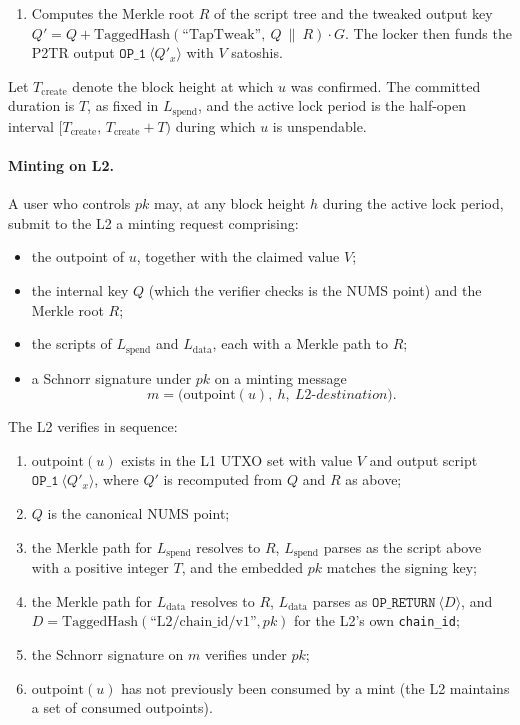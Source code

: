 \documentclass[11pt,a4paper]{article}
\begin{document}
\begin{enumerate}[leftmargin=*]
  \item Computes the Merkle root $R$ of the script tree and the tweaked output key $Q' = Q + \mathrm{TaggedHash}(\text{``TapTweak''},\ Q\ \|\ R) \cdot G$. The locker then funds the P2TR output $\texttt{OP\_1}\ \langle Q'_x\rangle$ with $V$ satoshis.
\end{enumerate}

Let $T_{\mathrm{create}}$ denote the block height at which $u$ was confirmed. The committed duration is $T$, as fixed in $L_{\mathrm{spend}}$, and the active lock period is the half-open interval $[T_{\mathrm{create}},\, T_{\mathrm{create}} + T)$ during which $u$ is unspendable.

\paragraph{Minting on L2.} A user who controls $pk$ may, at any block height $h$ during the active lock period, submit to the L2 a minting request comprising:

\begin{itemize}[leftmargin=*]
  \item the outpoint of $u$, together with the claimed value $V$;
  \item the internal key $Q$ (which the verifier checks is the NUMS point) and the Merkle root $R$;
  \item the scripts of $L_{\mathrm{spend}}$ and $L_{\mathrm{data}}$, each with a Merkle path to $R$;
  \item a Schnorr signature under $pk$ on a minting message
  \[
  m = \big(\mathrm{outpoint}(u),\ h,\ \mathit{L2\text{-}destination}\big).
  \]
\end{itemize}

The L2 verifies in sequence:
\begin{enumerate}[leftmargin=*,label=(\roman*)]
  \item $\mathrm{outpoint}(u)$ exists in the L1 UTXO set with value $V$ and output script $\texttt{OP\_1}\ \langle Q'_x\rangle$, where $Q'$ is recomputed from $Q$ and $R$ as above;
  \item $Q$ is the canonical NUMS point;
  \item the Merkle path for $L_{\mathrm{spend}}$ resolves to $R$, $L_{\mathrm{spend}}$ parses as the script above with a positive integer $T$, and the embedded $pk$ matches the signing key;
  \item the Merkle path for $L_{\mathrm{data}}$ resolves to $R$, $L_{\mathrm{data}}$ parses as $\texttt{OP\_RETURN}\ \langle D\rangle$, and $D = \mathrm{TaggedHash}(\text{``L2/chain\_id/v1''}, pk)$ for the L2's own \texttt{chain\_id};
  \item the Schnorr signature on $m$ verifies under $pk$;
  \item $\mathrm{outpoint}(u)$ has not previously been consumed by a mint (the L2 maintains a set of consumed outpoints).
\end{enumerate}
\end{document}
